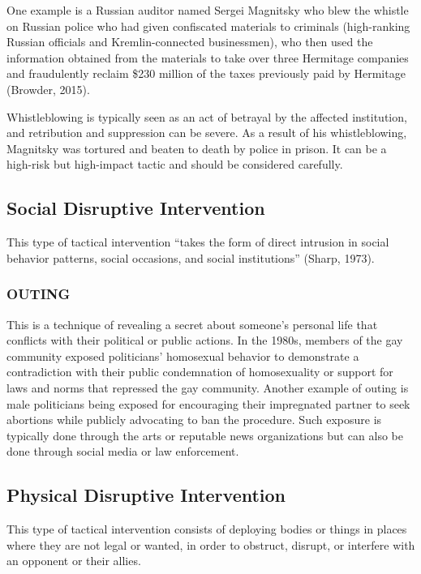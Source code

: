 \documentclass[twoside,a4paper,12pt,fleqn,openany]{extbook}
\begin{document}
One example is a Russian auditor named Sergei Magnitsky who blew the whistle on Russian police who had given confiscated materials to criminals (high-ranking Russian officials and Kremlin-connected businessmen), who then used the information obtained from the materials to take over three Hermitage companies and fraudulently reclaim \$230 million of the taxes previously paid by Hermitage (Browder, 2015).

Whistleblowing is typically seen as an act of betrayal by the affected institution, and retribution and suppression can be severe. As a result of his whistleblowing, Magnitsky was tortured and beaten to death by police in prison. It can be a high-risk but high-impact tactic and should be considered carefully.

\subsection*{Social Disruptive Intervention}

This type of tactical intervention “takes the form of direct intrusion in social behavior patterns, social occasions, and social institutions” (Sharp, 1973).

\subsubsection*{OUTING}

This is a technique of revealing a secret about someone’s personal life that conflicts with their political or public actions. In the 1980s, members of the gay community exposed politicians’ homosexual behavior to demonstrate a contradiction with their public condemnation of homosexuality or support for laws and norms that repressed the gay community. Another example of outing is male politicians being exposed for encouraging their impregnated partner to seek abortions while publicly advocating to ban the procedure. Such exposure is typically done through the arts or reputable news organizations but can also be done through social media or law enforcement.

\subsection*{Physical Disruptive Intervention}

This type of tactical intervention consists of deploying bodies or things in places where they are not legal or wanted, in order to obstruct, disrupt, or interfere with an opponent or their allies.
\end{document}

